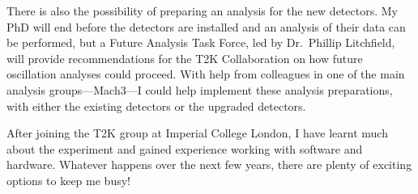 \documentclass[aps,pra,12pt,notitlepage,tightenlines]{revtex4-1}
\begin{document}
There is also the possibility of preparing an analysis for the new detectors. My PhD will end before the detectors are installed and an analysis of their data can be performed, but a Future Analysis Task Force, led by Dr.\ Phillip Litchfield, will provide recommendations for the T2K Collaboration on how future oscillation analyses could proceed. With help from colleagues in one of the main analysis groups---Mach3---I could help implement these analysis preparations, with either the existing detectors or the upgraded detectors.

After joining the T2K group at Imperial College London, I have learnt much about the experiment and gained experience working with software and hardware. Whatever happens over the next few years, there are plenty of exciting options to keep me busy!




\end{document}
